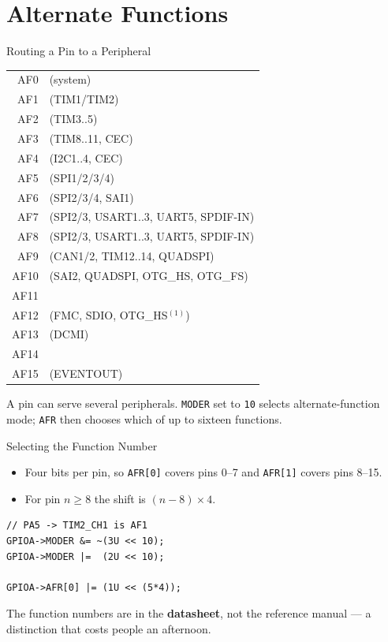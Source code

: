 \documentclass[aspectratio=169]{beamer}
\begin{document}
\section{Alternate Functions}

\begin{frame}{Routing a Pin to a Peripheral}
\centering
\small
\begin{tabular}{r l}
AF0  & (system) \\
AF1  & (TIM1/TIM2) \\
AF2  & (TIM3..5) \\
AF3  & (TIM8..11, CEC) \\
AF4  & (I2C1..4, CEC) \\
AF5  & (SPI1/2/3/4) \\
AF6  & (SPI2/3/4, SAI1) \\
AF7  & (SPI2/3, USART1..3, UART5, SPDIF-IN) \\
AF8  & (SPI2/3, USART1..3, UART5, SPDIF-IN) \\
AF9  & (CAN1/2, TIM12..14, QUADSPI) \\
AF10 & (SAI2, QUADSPI, OTG\_HS, OTG\_FS) \\
AF11 & \\
AF12 & (FMC, SDIO, OTG\_HS$^{(1)}$) \\
AF13 & (DCMI) \\
AF14 & \\
AF15 & (EVENTOUT) \\
\end{tabular}

\vspace{0.5em}
{\small A pin can serve several peripherals. \texttt{MODER} set to
\texttt{10} selects alternate-function mode; \texttt{AFR} then chooses
which of up to sixteen functions.}
\end{frame}

\begin{frame}[fragile]{Selecting the Function Number}
\begin{itemize}
  \item Four bits per pin, so \texttt{AFR[0]} covers pins 0--7 and \texttt{AFR[1]} covers pins 8--15.
  \item For pin $n \ge 8$ the shift is $(n-8)\times 4$.
\end{itemize}

\begin{lstlisting}
// PA5 -> TIM2_CH1 is AF1
GPIOA->MODER &= ~(3U << 10);
GPIOA->MODER |=  (2U << 10);

GPIOA->AFR[0] |= (1U << (5*4));
\end{lstlisting}

{\small The function numbers are in the \textbf{datasheet}, not the
reference manual --- a distinction that costs people an afternoon.}
\end{frame}
\end{document}
